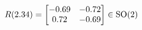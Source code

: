 \documentclass[preview]{standalone}
\begin{document}
\begin{align*}
\special{dvisvgm:raw <g id='unique000'>}R(2.34) = \begin{bmatrix} -0.69 & -0.72 \\ 0.72 & -0.69 \end{bmatrix} \in \text{SO}(2)\special{dvisvgm:raw </g>}
\end{align*}
\end{document}
